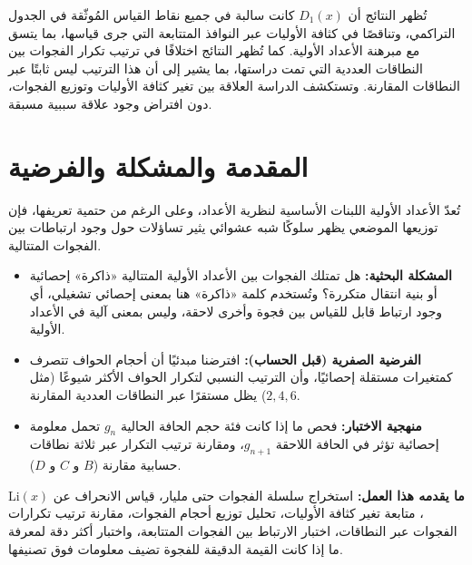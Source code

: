 \documentclass[12pt,a4paper]{article}
\begin{document}
تُظهر النتائج أن $D_1(x)$ كانت سالبة في جميع نقاط القياس المُوثّقة في الجدول التراكمي، وتناقصًا في كثافة الأوليات عبر النوافذ المتتابعة التي جرى قياسها، بما يتسق مع مبرهنة الأعداد الأولية. كما تُظهر النتائج اختلافًا في ترتيب تكرار الفجوات بين النطاقات العددية التي تمت دراستها، بما يشير إلى أن هذا الترتيب ليس ثابتًا عبر النطاقات المقارنة. وتستكشف الدراسة العلاقة بين تغير كثافة الأوليات وتوزيع الفجوات، دون افتراض وجود علاقة سببية مسبقة.

\section{المقدمة والمشكلة والفرضية}
تُعدّ الأعداد الأولية اللبنات الأساسية لنظرية الأعداد، وعلى الرغم من حتمية تعريفها، فإن توزيعها الموضعي يظهر سلوكًا شبه عشوائي يثير تساؤلات حول وجود ارتباطات بين الفجوات المتتالية.

\begin{itemize}
    \item \textbf{المشكلة البحثية:} هل تمتلك الفجوات بين الأعداد الأولية المتتالية «ذاكرة» إحصائية أو بنية انتقال متكررة؟ وتُستخدم كلمة «ذاكرة» هنا بمعنى إحصائي تشغيلي، أي وجود ارتباط قابل للقياس بين فجوة وأخرى لاحقة، وليس بمعنى آلية في الأعداد الأولية.
    \item \textbf{الفرضية الصفرية (قبل الحساب):} افترضنا مبدئيًا أن أحجام الحواف تتصرف كمتغيرات مستقلة إحصائيًا، وأن الترتيب النسبي لتكرار الحواف الأكثر شيوعًا (مثل $2, 4, 6$) يظل مستقرًا عبر النطاقات العددية المقارنة.
    \item \textbf{منهجية الاختبار:} فحص ما إذا كانت فئة حجم الحافة الحالية $g_n$ تحمل معلومة إحصائية تؤثر في الحافة اللاحقة $g_{n+1}$، ومقارنة ترتيب التكرار عبر ثلاثة نطاقات حسابية مقارنة ($B$ و $C$ و $D$).
\end{itemize}

\noindent \textbf{ما يقدمه هذا العمل:} استخراج سلسلة الفجوات حتى مليار، قياس الانحراف عن $\mathrm{Li}(x)$، متابعة تغير كثافة الأوليات، تحليل توزيع أحجام الفجوات، مقارنة ترتيب تكرارات الفجوات عبر النطاقات، اختبار الارتباط بين الفجوات المتتابعة، واختبار أكثر دقة لمعرفة ما إذا كانت القيمة الدقيقة للفجوة تضيف معلومات فوق تصنيفها.

\end{document}
